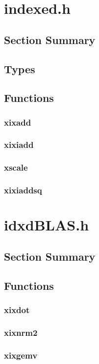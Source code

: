 \documentclass[12pt]{article}
\theoremstyle{definition}
\numberwithin{equation}{section}
\numberwithin{figure}{section}
\begin{document}
\section{indexed.h}
  \subsection{Section Summary}
  \subsection{Types}
  \subsection{Functions}
    \subsubsection{xixadd}
    \subsubsection{xixiadd}
    \subsubsection{xscale}
    \subsubsection{xixiaddsq}
\section{idxdBLAS.h}
  \label{sec:idxdBLAS}
  \subsection{Section Summary}
  \subsection{Functions}
    \subsubsection{xixdot}
    \subsubsection{xixnrm2}
    \subsubsection{xixgemv}
\end{document}
